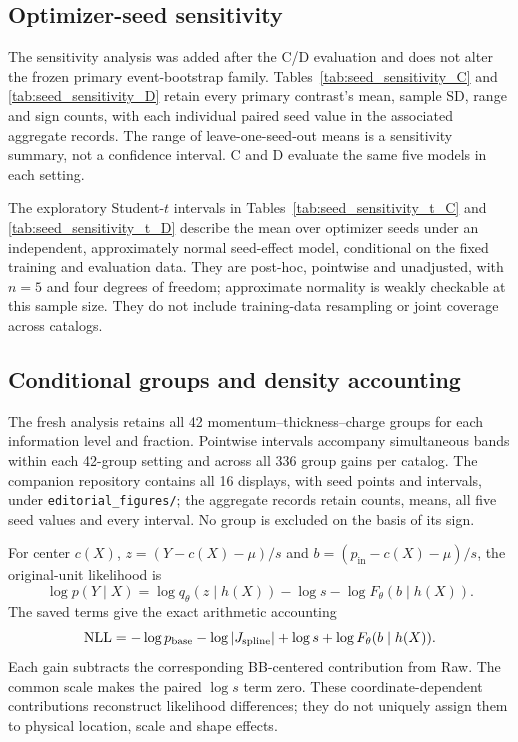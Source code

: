 \documentclass[smallextended,epjc3]{svjour3}
\newcommand{\pin}{p_{\mathrm{in}}}
\begin{document}
\subsection{Optimizer-seed sensitivity}
The sensitivity analysis was added after the C/D evaluation and does not
alter the frozen primary event-bootstrap family. Tables~\ref{tab:seed_sensitivity_C}
and \ref{tab:seed_sensitivity_D} retain every primary
contrast's mean, sample SD, range and sign counts, with each individual
paired seed value in the associated aggregate records.
The range of leave-one-seed-out means is a sensitivity summary, not a
confidence interval. C and D evaluate the same five models in each setting.


\clearpage
The exploratory Student-$t$ intervals in Tables~\ref{tab:seed_sensitivity_t_C}
and \ref{tab:seed_sensitivity_t_D} describe the mean over optimizer
seeds under an independent, approximately normal seed-effect model,
conditional on the fixed training and evaluation data. They are post-hoc,
pointwise and unadjusted, with $n=5$ and four degrees of freedom; approximate
normality is weakly checkable at this sample size. They do not include
training-data resampling or joint coverage across catalogs.

\clearpage

\subsection{Conditional groups and density accounting}
The fresh analysis retains all 42 momentum--thickness--charge groups for
each information level and fraction. Pointwise intervals accompany
simultaneous bands within each 42-group setting and across all 336 group
gains per catalog. The companion repository contains all 16 displays, with seed
points and intervals, under \texttt{editorial\_figures/}; the aggregate
records retain counts, means, all five seed values and every interval.
No group is excluded on the basis of its sign.

For center $c(X)$, $z=(Y-c(X)-\mu)/s$ and
$b=(\pin-c(X)-\mu)/s$, the original-unit likelihood is
\begin{equation}
 \log p(Y\mid X)=\log q_\theta(z\mid h(X))-\log s
                 -\log F_\theta(b\mid h(X)).
 \label{eq:supp_likelihood}
\end{equation}
The saved terms give the exact arithmetic accounting
\begin{equation}
 \mathrm{NLL}=-\log p_{\rm base}-\log|J_{\rm spline}|
                +\log s+\log F_\theta(b\mid h(X)).
\end{equation}
Each gain subtracts the corresponding BB-centered contribution from Raw.
The common scale makes the paired $\log s$ term zero. These coordinate-dependent
contributions reconstruct likelihood differences; they do not uniquely assign
them to physical location, scale and shape effects.
\end{document}
